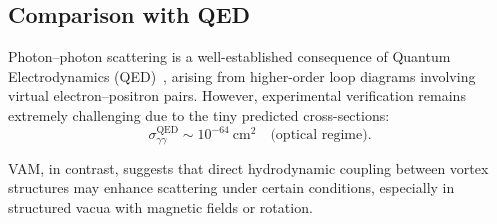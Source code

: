         \subsection{Comparison with QED}

                Photon–photon scattering is a well-established consequence of Quantum Electrodynamics (QED)~\cite{heisenberg1936,schwinger1951}, arising from higher-order loop diagrams involving virtual electron–positron pairs. However, experimental verification remains extremely challenging due to the tiny predicted cross-sections:
                \[
                    \sigma_{\gamma\gamma}^{\text{QED}} \sim 10^{-64}~\text{cm}^2 \quad \text{(optical regime)}.
                \]

                VAM, in contrast, suggests that direct hydrodynamic coupling between vortex structures may enhance scattering under certain conditions, especially in structured vacua with magnetic fields or rotation.

